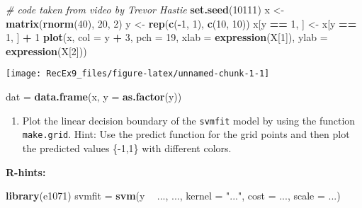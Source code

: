 \documentclass[]{article}
\newenvironment{Shaded}{\begin{snugshade}}{\end{snugshade}}
\newcommand{\CommentTok}[1]{\textcolor[rgb]{0.56,0.35,0.01}{\textit{#1}}}
\newcommand{\DataTypeTok}[1]{\textcolor[rgb]{0.13,0.29,0.53}{#1}}
\newcommand{\DecValTok}[1]{\textcolor[rgb]{0.00,0.00,0.81}{#1}}
\newcommand{\KeywordTok}[1]{\textcolor[rgb]{0.13,0.29,0.53}{\textbf{#1}}}
\newcommand{\NormalTok}[1]{#1}
\newcommand{\OperatorTok}[1]{\textcolor[rgb]{0.81,0.36,0.00}{\textbf{#1}}}
\newcommand{\StringTok}[1]{\textcolor[rgb]{0.31,0.60,0.02}{#1}}
\providecommand{\tightlist}{%
  \setlength{\itemsep}{0pt}\setlength{\parskip}{0pt}}
\begin{document}
\begin{Shaded}
\begin{Highlighting}[]
\CommentTok{# code taken from video by Trevor Hastie}
\KeywordTok{set.seed}\NormalTok{(}\DecValTok{10111}\NormalTok{)}
\NormalTok{x <-}\StringTok{ }\KeywordTok{matrix}\NormalTok{(}\KeywordTok{rnorm}\NormalTok{(}\DecValTok{40}\NormalTok{), }\DecValTok{20}\NormalTok{, }\DecValTok{2}\NormalTok{)}
\NormalTok{y <-}\StringTok{ }\KeywordTok{rep}\NormalTok{(}\KeywordTok{c}\NormalTok{(}\OperatorTok{-}\DecValTok{1}\NormalTok{, }\DecValTok{1}\NormalTok{), }\KeywordTok{c}\NormalTok{(}\DecValTok{10}\NormalTok{, }\DecValTok{10}\NormalTok{))}
\NormalTok{x[y }\OperatorTok{==}\StringTok{ }\DecValTok{1}\NormalTok{, ] <-}\StringTok{ }\NormalTok{x[y }\OperatorTok{==}\StringTok{ }\DecValTok{1}\NormalTok{, ] }\OperatorTok{+}\StringTok{ }\DecValTok{1}
\KeywordTok{plot}\NormalTok{(x, }\DataTypeTok{col =}\NormalTok{ y }\OperatorTok{+}\StringTok{ }\DecValTok{3}\NormalTok{, }\DataTypeTok{pch =} \DecValTok{19}\NormalTok{, }\DataTypeTok{xlab =} \KeywordTok{expression}\NormalTok{(X[}\DecValTok{1}\NormalTok{]), }\DataTypeTok{ylab =} \KeywordTok{expression}\NormalTok{(X[}\DecValTok{2}\NormalTok{]))}
\end{Highlighting}
\end{Shaded}

\texttt{[image: RecEx9\_files/figure-latex/unnamed-chunk-1-1]}

\begin{Shaded}
\begin{Highlighting}[]
\NormalTok{dat =}\StringTok{ }\KeywordTok{data.frame}\NormalTok{(x, }\DataTypeTok{y =} \KeywordTok{as.factor}\NormalTok{(y))}
\end{Highlighting}
\end{Shaded}

\begin{enumerate}
\def\labelenumi{(\alph{enumi})}
\tightlist
\item
  Plot the linear decision boundary of the \texttt{svmfit} model by
  using the function \texttt{make.grid}. Hint: Use the predict function
  for the grid points and then plot the predicted values \{-1,1\} with
  different colors.
\end{enumerate}

\textbf{R-hints:}

\begin{Shaded}
\begin{Highlighting}[]
\KeywordTok{library}\NormalTok{(e1071)}
\NormalTok{svmfit =}\StringTok{ }\KeywordTok{svm}\NormalTok{(y }\OperatorTok{~}\StringTok{ }\NormalTok{..., ..., }\DataTypeTok{kernel =} \StringTok{"..."}\NormalTok{, }\DataTypeTok{cost =}\NormalTok{ ..., }\DataTypeTok{scale =}\NormalTok{ ...)}
\end{Highlighting}
\end{Shaded}
\end{document}
